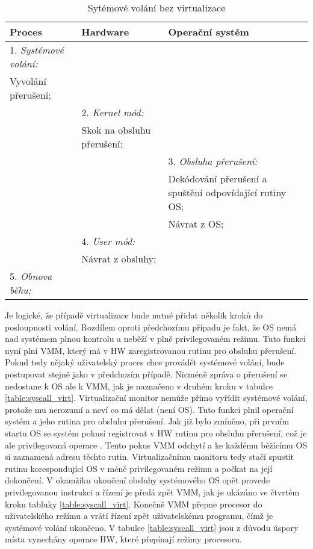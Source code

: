 \begin{table}
    \centering        
    \begin{tabularx}{\textwidth}{XXX}
    Proces & Hardware & Operační systém \\
    \hline    
    1. \textit{Systémové volání:} && \\ Vyvolání přerušení; && \\
    & 2. \textit{Kernel mód:} & \\ & Skok na obsluhu přerušení; & \\
    && 3. \textit{Obsluha přerušení:}  \\ && Dekódování přerušení a spuštění odpovídající rutiny OS;\\ && Návrat z OS; \\
    & 4. \textit{User mód:} & \\ & Návrat z obsluhy; & \\
    5. \textit{Obnova běhu;} && \\
    \end{tabularx}
    \caption[Sytémové volání bez virtualizace]{Sytémové volání bez virtualizace \cite{vmm_book}}
    \label{table:syscall_nonvirt}
\end{table}

Je logické, že případě virtualizace bude nutné přidat několik kroků do posloupnosti volání. Rozdílem oproti předchozímu případu je fakt, že OS nemá nad systémem plnou kontrolu a neběží v plně privilegovaném režimu. Tuto funkci nyní plní VMM, který
má v HW zaregistrovanou rutinu pro obsluhu přerušení. Pokud tedy nějaký uživatelský proces chce provádět systémové volání, bude postupovat stejně jako v předchozím případě. Nicméně zpráva o přerušení se nedostane k OS ale k VMM, jak je naznačeno v
druhém kroku v tabulce \ref{table:syscall_virt}. Virtualizační monitor nemůže přímo vyřídit systémové volání, protože mu nerozumí a neví co má dělat (není OS). Tuto funkci plnil operační systém a jeho rutina pro obsluhu přerušení. Jak již bylo zmíněno,
při prvním startu OS se systém pokusí registrovat v HW rutinu pro obsluhu přerušení, což je ale privilegovaná operace \cite{vmm_book}. Tento pokus VMM odchytí a ke každému běžícímu OS si zaznamená adresu těchto rutin. Virtualizačnímu monitoru tedy stačí
spustit rutinu korespondující OS v méně privilegovaném režimu a počkat na její dokončení. V okamžiku ukončení obsluhy systémového OS opět provede privilegovanou instrukci a řízení je předá zpět VMM, jak je ukázáno ve čtvrtém kroku tabluky \ref{table:syscall_virt}.
Konečně VMM přepne procesor do uživatelského režimu a vrátí řízení zpět uživatelskému programu, čímž je systémové volání ukončeno. V tabulce \ref{table:syscall_virt} jsou z důvodu úspory místa vynechány operace HW, které přepínají režimy procesoru.

